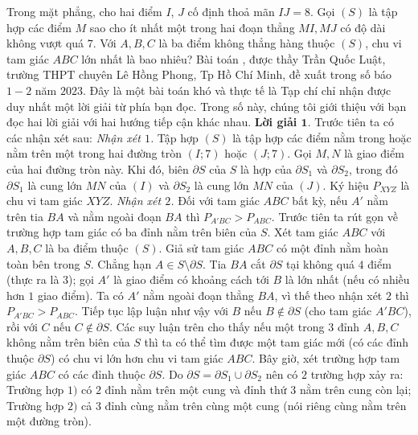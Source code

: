 \begin{multicols}{2}
	{}
	Trong mặt phẳng, cho hai điểm $I$, $J$ cố định thoả mãn $IJ=8$.  Gọi $(S)$ là tập hợp các điểm $M$ sao cho ít nhất một trong hai đoạn thẳng $MI,MJ$ có độ dài không vượt quá $7$. Với $A,B,C$ là ba điểm không thẳng hàng thuộc $(S)$, chu vi tam giác $ABC$ lớn nhất là bao nhiêu?
	\vskip 0.05cm
	Bài toán {}, được thầy Trần Quốc Luật, trường THPT chuyên Lê Hồng Phong, Tp Hồ Chí Minh, đề xuất trong số báo $1-2$ năm $2023$. Đây là một bài toán khó và thực tế là Tạp chí chỉ nhận được duy nhất một lời giải từ phía bạn đọc. Trong số này, chúng tôi giới thiệu với bạn đọc hai lời giải với hai hướng tiếp cận khác nhau. 
	\vskip 0.05cm
	\textbf{\color{thachthuctoanhoc}Lời giải $\pmb{1.}$} Trước tiên ta có các nhận xét sau:
	\vskip 0.05cm
	\textit{Nhận xét $1$.} Tập hợp $(S)$ là tập hợp các điểm nằm trong hoặc nằm trên một trong hai đường tròn $(I;7)$ hoặc $(J;7)$. 
	\vskip 0.05cm
	Gọi $M,N$ là giao điểm của hai đường tròn này. Khi đó, biên $\partial S$ của $S$ là hợp của $\partial S_1$ và $\partial S_2$, trong đó $\partial S_1$ là cung lớn $MN$ của $(I)$ và $\partial S_2$ là cung lớn $MN$ của $(J)$.
 	\vskip 0.05cm	
	Ký hiệu $P_{XYZ}$ là chu vi tam giác $XYZ$.
	\vskip 0.05cm
	\textit{Nhận xét $2$.} Đối với tam giác $ABC$ bất kỳ, nếu $A'$ nằm trên tia $BA$ và nằm ngoài đoạn $BA$ thì $P_{A'BC}> P_{ABC}$. 
	\vskip 0.05cm
	Trước tiên ta rút gọn về trường hợp tam giác có ba đỉnh nằm trên biên của $S$.
	\vskip 0.05cm
	Xét tam giác $ABC$ với $A,B,C$ là ba điểm thuộc $(S)$. Giả sử tam giác $ABC$ có một đỉnh nằm hoàn toàn bên trong $S$. Chẳng hạn $A\in S\setminus \partial S$. Tia $BA$ cắt $\partial S$ tại không quá $4$ điểm (thực ra là $3$); gọi $A'$ là giao điểm có khoảng cách tới $B$ là lớn nhất (nếu có nhiều hơn $1$ giao điểm). Ta có $A'$ nằm ngoài đoạn thẳng $BA$, vì thế theo nhận xét $2$ thì $P_{A'BC}> P_{ABC}$. Tiếp tục lập luận như vậy với $B$ nếu $B\notin \partial S$ (cho tam giác $A'BC$), rồi với $C$ nếu $C\notin \partial S$. Các suy luận trên cho thấy nếu một trong $3$ đỉnh $A, B, C$ không nằm trên biên của $S$ thì ta có thể tìm được một tam giác mới (có các đỉnh thuộc $\partial S$) có chu vi lớn hơn chu vi tam giác $ABC$.
	\vskip 0.05cm
	Bây giờ, xét trường hợp tam giác $ABC$ có các đỉnh thuộc $\partial S$. Do $\partial S = \partial S_1 \cup \partial S_2$ nên có $2$ trường hợp xảy ra: Trường hợp $1)$ có $2$ đỉnh nằm trên một cung và đỉnh thứ $3$ nằm trên cung còn lại; Trường hợp $2)$ cả $3$ đỉnh cùng nằm trên cùng một cung (nói riêng cùng nằm trên một đường tròn).

\end{multicols}
